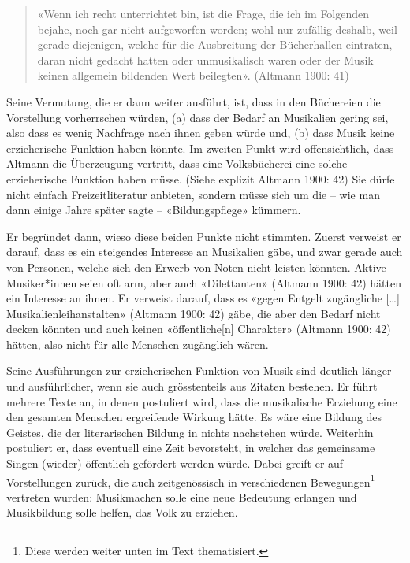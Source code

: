 \documentclass[a4paper,
fontsize=11pt,
oneside,
numbers=noperiodatend,
parskip=half-,
bibliography=totoc,
final
]{scrartcl}
\begin{document}
\begin{quote}
«Wenn ich recht unterrichtet bin, ist die Frage, die ich im Folgenden
bejahe, noch gar nicht aufgeworfen worden; wohl nur zufällig deshalb,
weil gerade diejenigen, welche für die Ausbreitung der Bücherhallen
eintraten, daran nicht gedacht hatten oder unmusikalisch waren oder der
Musik keinen allgemein bildenden Wert beilegten». (Altmann 1900: 41)
\end{quote}

Seine Vermutung, die er dann weiter ausführt, ist, dass in den
Büchereien die Vorstellung vorherrschen würden, (a) dass der Bedarf an
Musikalien gering sei, also dass es wenig Nachfrage nach ihnen geben
würde und, (b) dass Musik keine erzieherische Funktion haben könnte. Im
zweiten Punkt wird offensichtlich, dass Altmann die Überzeugung
vertritt, dass eine Volksbücherei eine solche erzieherische Funktion
haben müsse. (Siehe explizit Altmann 1900: 42) Sie dürfe nicht einfach
Freizeitliteratur anbieten, sondern müsse sich um die -- wie man dann
einige Jahre später sagte -- «Bildungspflege» kümmern.

Er begründet dann, wieso diese beiden Punkte nicht stimmten. Zuerst
verweist er darauf, dass es ein steigendes Interesse an Musikalien gäbe,
und zwar gerade auch von Personen, welche sich den Erwerb von Noten
nicht leisten könnten. Aktive Musiker*innen seien oft arm, aber auch
«Dilettanten» (Altmann 1900: 42) hätten ein Interesse an ihnen. Er
verweist darauf, dass es «gegen Entgelt zugängliche {[}\ldots{]}
Musikalienleihanstalten» (Altmann 1900: 42) gäbe, die aber den Bedarf
nicht decken könnten und auch keinen «öffentliche{[}n{]} Charakter»
(Altmann 1900: 42) hätten, also nicht für alle Menschen zugänglich
wären.

Seine Ausführungen zur erzieherischen Funktion von Musik sind deutlich
länger und ausführlicher, wenn sie auch grösstenteils aus Zitaten
bestehen. Er führt mehrere Texte an, in denen postuliert wird, dass die
musikalische Erziehung eine den gesamten Menschen ergreifende Wirkung
hätte. Es wäre eine Bildung des Geistes, die der literarischen Bildung
in nichts nachstehen würde. Weiterhin postuliert er, dass eventuell eine
Zeit bevorsteht, in welcher das gemeinsame Singen (wieder) öffentlich
gefördert werden würde. Dabei greift er auf Vorstellungen zurück, die
auch zeitgenössisch in verschiedenen Bewegungen\footnote{Diese werden
  weiter unten im Text thematisiert.} vertreten wurden: Musikmachen
solle eine neue Bedeutung erlangen und Musikbildung solle helfen, das
Volk zu erziehen.
\end{document}
